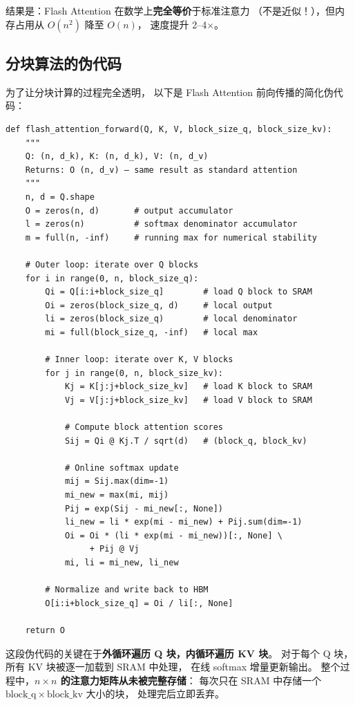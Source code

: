 结果是：Flash Attention 在数学上\textbf{完全等价}于标准注意力
（不是近似！），但内存占用从 $O(n^2)$ 降至 $O(n)$，
速度提升 2--4$\times$。

\subsection{分块算法的伪代码}

为了让分块计算的过程完全透明，
以下是 Flash Attention 前向传播的简化伪代码：

\begin{lstlisting}[caption={Flash Attention forward pass (simplified)}]
def flash_attention_forward(Q, K, V, block_size_q, block_size_kv):
    """
    Q: (n, d_k), K: (n, d_k), V: (n, d_v)
    Returns: O (n, d_v) — same result as standard attention
    """
    n, d = Q.shape
    O = zeros(n, d)       # output accumulator
    l = zeros(n)          # softmax denominator accumulator
    m = full(n, -inf)     # running max for numerical stability

    # Outer loop: iterate over Q blocks
    for i in range(0, n, block_size_q):
        Qi = Q[i:i+block_size_q]        # load Q block to SRAM
        Oi = zeros(block_size_q, d)     # local output
        li = zeros(block_size_q)        # local denominator
        mi = full(block_size_q, -inf)   # local max

        # Inner loop: iterate over K, V blocks
        for j in range(0, n, block_size_kv):
            Kj = K[j:j+block_size_kv]   # load K block to SRAM
            Vj = V[j:j+block_size_kv]   # load V block to SRAM

            # Compute block attention scores
            Sij = Qi @ Kj.T / sqrt(d)   # (block_q, block_kv)

            # Online softmax update
            mij = Sij.max(dim=-1)
            mi_new = max(mi, mij)
            Pij = exp(Sij - mi_new[:, None])
            li_new = li * exp(mi - mi_new) + Pij.sum(dim=-1)
            Oi = Oi * (li * exp(mi - mi_new))[:, None] \
                 + Pij @ Vj
            mi, li = mi_new, li_new

        # Normalize and write back to HBM
        O[i:i+block_size_q] = Oi / li[:, None]

    return O
\end{lstlisting}

这段伪代码的关键在于\textbf{外循环遍历 Q 块，内循环遍历 KV 块}。
对于每个 Q 块，所有 KV 块被逐一加载到 SRAM 中处理，
在线 softmax 增量更新输出。
整个过程中，\textbf{$n \times n$ 的注意力矩阵从未被完整存储}：
每次只在 SRAM 中存储一个
$\mathrm{block\_q} \times \mathrm{block\_kv}$ 大小的块，
处理完后立即丢弃。


